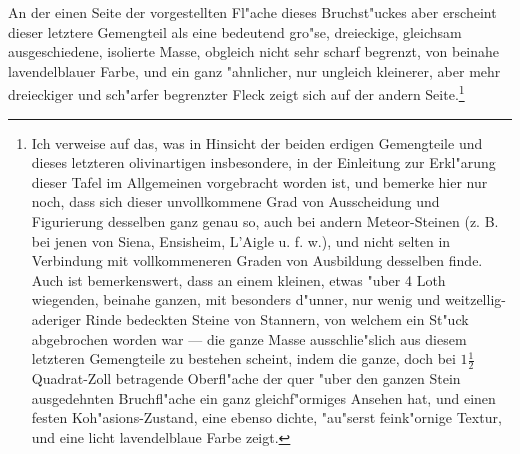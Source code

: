 \documentclass[a4paper, 11pt, oneside, german]{article}
\begin{document}
An der einen Seite der vorgestellten Fl"ache dieses Bruchst"uckes aber erscheint dieser letztere Gemengteil als eine bedeutend gro"se, dreieckige, gleichsam ausgeschiedene, isolierte Masse, obgleich nicht sehr scharf begrenzt, von beinahe lavendelblauer Farbe, und ein ganz "ahnlicher, nur ungleich kleinerer, aber mehr dreieckiger und sch"arfer begrenzter Fleck zeigt sich auf der andern Seite.\footnote{Ich verweise auf das, was in Hinsicht der beiden erdigen Gemengteile und dieses letzteren olivinartigen insbesondere, in der Einleitung zur Erkl"arung dieser Tafel im Allgemeinen vorgebracht worden ist, und bemerke hier nur noch, dass sich dieser unvollkommene Grad von Ausscheidung und Figurierung desselben ganz genau so, auch bei andern Meteor-Steinen (z. B. bei jenen von Siena, Ensisheim, L'Aigle u. f. w.), und nicht selten in Verbindung mit vollkommeneren Graden von Ausbildung desselben finde. Auch ist bemerkenswert, dass an einem kleinen, etwas "uber 4 Loth wiegenden, beinahe ganzen, mit besonders d"unner, nur wenig und weitzellig-aderiger Rinde bedeckten Steine von Stannern, von welchem ein St"uck abgebrochen worden war --- die ganze Masse ausschlie"slich aus diesem letzteren Gemengteile zu bestehen scheint, indem die ganze, doch bei $1\frac{1}{2}$ Quadrat-Zoll betragende Oberfl"ache der quer "uber den ganzen Stein ausgedehnten Bruchfl"ache ein ganz gleichf"ormiges Ansehen hat, und einen festen Koh"asions-Zustand, eine ebenso dichte, "au"serst feink"ornige Textur, und eine licht lavendelblaue Farbe zeigt.}
\end{document}
